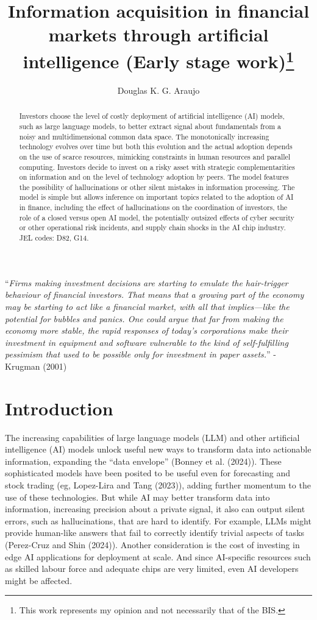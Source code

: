 \documentclass[
]{article}
\title{Information acquisition in financial markets through artificial
intelligence (Early stage work)\thanks{This work represents my opinion
and not necessarily that of the BIS.}}
\author{Douglas K. G. Araujo}
\affil{%
                  Bank for International
Settlements, douglas.araujo@bis.org
              }
\date{}
\theoremstyle{plain}
\theoremstyle{remark}
\begin{document}
\maketitle
\begin{abstract}
Investors choose the level of costly deployment of artificial
intelligence (AI) models, such as large language models, to better
extract signal about fundamentals from a noisy and multidimensional
common data space. The monotonically increasing technology evolves over
time but both this evolution and the actual adoption depends on the use
of scarce resources, mimicking constraints in human resources and
parallel computing. Investors decide to invest on a risky asset with
strategic complementarities on information and on the level of
technology adoption by peers. The model features the possibility of
hallucinations or other silent mistakes in information processing. The
model is simple but allows inference on important topics related to the
adoption of AI in finance, including the effect of hallucinations on the
coordination of investors, the role of a closed versus open AI model,
the potentially outsized effects of cyber security or other operational
risk incidents, and supply chain shocks in the AI chip industry. JEL
codes: D82, G14.
\end{abstract}

``\emph{Firms making investment decisions are starting to emulate the
hair-trigger behaviour of financial investors. That means that a growing
part of the economy may be starting to act like a financial market, with
all that implies---like the potential for bubbles and panics. One could
argue that far from making the economy more stable, the rapid responses
of today's corporations make their investment in equipment and software
vulnerable to the kind of self-fulfilling pessimism that used to be
possible only for investment in paper assets.}'' - Krugman (2001)

\section{Introduction}\label{introduction}

The increasing capabilities of large language models (LLM) and other
artificial intelligence (AI) models unlock useful new ways to transform
data into actionable information, expanding the ``data envelope''
(Bonney et al. (2024)). These sophisticated models have been posited to
be useful even for forecasting and stock trading (eg, Lopez-Lira and
Tang (2023)), adding further momentum to the use of these technologies.
But while AI may better transform data into information, increasing
precision about a private signal, it also can output silent errors, such
as hallucinations, that are hard to identify. For example, LLMs might
provide human-like answers that fail to correctly identify trivial
aspects of tasks (Perez-Cruz and Shin (2024)). Another consideration is
the cost of investing in edge AI applications for deployment at scale.
And since AI-specific resources such as skilled labour force and
adequate chips are very limited, even AI developers might be affected.
\end{document}

